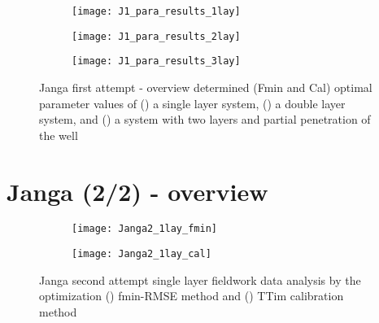 \begin{figure}[h!]
	\centering
	\begin{subfigure}[b]{\linewidth}
		\centering\texttt{[image: J1\_para\_results\_1lay]}
		\captionsetup{justification=centering}		
		\caption{\label{fig:J1_para_results_1lay}}
		\end{subfigure}\vfill
	\begin{subfigure}[b]{\linewidth}
		\centering\texttt{[image: J1\_para\_results\_2lay]}
		\captionsetup{justification=centering}		
		\caption{\label{fig:J1_para_results_2lay}}
		\end{subfigure}
	\begin{subfigure}[b]{\linewidth}
		\centering\texttt{[image: J1\_para\_results\_3lay]}
		\captionsetup{justification=centering}		
		\caption{\label{fig:J1_para_results_3lay}}
		\end{subfigure}		
	\captionsetup{justification=centering}	
	\caption{Janga first attempt - overview determined (Fmin and Cal) optimal parameter values of () a single layer system, () a double layer system, and () a system with two layers and partial penetration of the well} 
	\label{fig:J1_para_results}
\end{figure} 

\clearpage\section{Janga (2/2) - overview}
\label{sec:Janga2_overview}

\begin{figure}[h!]
	\centering
	\begin{subfigure}[b]{0.64\linewidth}
		\centering\texttt{[image: Janga2\_1lay\_fmin]}
		\captionsetup{justification=centering}		
		\caption{\label{fig:Janga2_1lay_fmin}}
		\end{subfigure}\vfill
	\begin{subfigure}[b]{0.64\linewidth}
		\centering\texttt{[image: Janga2\_1lay\_cal]}
		\captionsetup{justification=centering}		
		\caption{\label{fig:Janga2_1lay_cal}}
		\end{subfigure}
	\captionsetup{justification=centering}	
	\caption{Janga second attempt single layer fieldwork data analysis by the optimization () fmin-RMSE method and () TTim calibration method} 
	\label{fig:Janga2_1lay_analysis}
\end{figure} 

